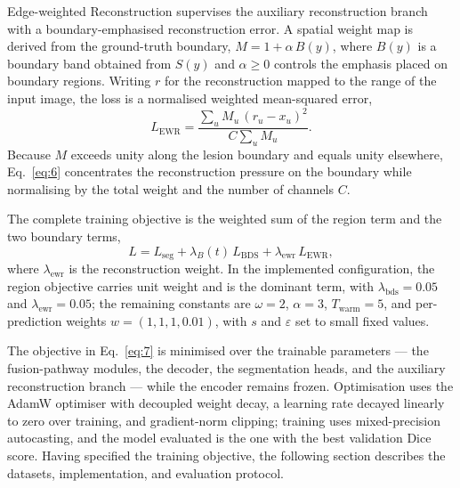 Edge-weighted Reconstruction supervises the auxiliary reconstruction branch with a boundary-emphasised reconstruction error. A spatial weight map is derived from the ground-truth boundary, $M = 1 + \alpha\,B(y)$, where $B(y)$ is a boundary band obtained from $S(y)$ and $\alpha \ge 0$ controls the emphasis placed on boundary regions. Writing $r$ for the reconstruction mapped to the range of the input image, the loss is a normalised weighted mean-squared error,
\begin{equation}
L_{\mathrm{EWR}} = \frac{\sum_{u} M_u\,(r_u - x_u)^2}{C\sum_{u} M_u}. \tag{6}
\label{eq:6}
\end{equation}
Because $M$ exceeds unity along the lesion boundary and equals unity elsewhere, Eq.~\eqref{eq:6} concentrates the reconstruction pressure on the boundary while normalising by the total weight and the number of channels $C$.

The complete training objective is the weighted sum of the region term and the two boundary terms,
\begin{equation}
L = L_{\mathrm{seg}} + \lambda_{B}(t)\,L_{\mathrm{BDS}} + \lambda_{\mathrm{ewr}}\,L_{\mathrm{EWR}}, \tag{7}
\label{eq:7}
\end{equation}
where $\lambda_{\mathrm{ewr}}$ is the reconstruction weight. In the implemented configuration, the region objective carries unit weight and is the dominant term, with $\lambda_{\mathrm{bds}} = 0.05$ and $\lambda_{\mathrm{ewr}} = 0.05$; the remaining constants are $\omega = 2$, $\alpha = 3$, $T_{\mathrm{warm}} = 5$, and per-prediction weights $w = (1, 1, 1, 0.01)$, with $s$ and $\varepsilon$ set to small fixed values.

The objective in Eq.~\eqref{eq:7} is minimised over the trainable parameters --- the fusion-pathway modules, the decoder, the segmentation heads, and the auxiliary reconstruction branch --- while the encoder remains frozen. Optimisation uses the AdamW optimiser with decoupled weight decay, a learning rate decayed linearly to zero over training, and gradient-norm clipping; training uses mixed-precision autocasting, and the model evaluated is the one with the best validation Dice score. Having specified the training objective, the following section describes the datasets, implementation, and evaluation protocol.
